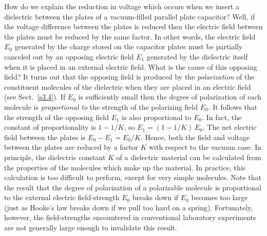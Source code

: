 How do we explain the reduction in voltage which occurs when we insert a
dielectric between the plates of a vacuum-filled parallel plate capacitor? 
Well, if the voltage difference between the plates is reduced then the
electric field between the plates must be reduced by the same factor. 
In other words, the electric field $E_0$ generated by the charge
stored on the capacitor plates  must be partially canceled out
by an opposing electric field $E_1$ generated  by the dielectric itself
when it is placed in an external electric field. What is the
cause of this opposing field? It turns out that the opposing field is
produced by the {\em polarization}\/ of the constituent molecules of the
dielectric when they are placed in an electric field (see Sect.~\ref{s3.4}). 
 If $E_0$ is sufficiently small then the degree of
polarization of each molecule is {\em proportional to}\/ the 
strength of the polarizing field
$E_0$. It follows that the strength of the  opposing field $E_1$ is also proportional
to $E_0$. In fact, the constant of proportionality is $1-1/K$, so
$E_1 = (1-1/K)\,E_0$. The net electric field between the plates is
$E_0 - E_1 = E_0/K$. Hence, both the field and
voltage between the plates are reduced by a factor
$K$ with respect to the vacuum case.
 In principle, the dielectric constant $K$ of a dielectric
material can be calculated from  the
properties of the molecules which make up the
material. In practice, this calculation is too difficult to perform, except
for very simple molecules. Note that the result that the degree of polarization of
a polarizable molecule is proportional to the external electric field-strength $E_0$ breaks down if $E_0$ becomes too large (just as Hooke's
law breaks down if we pull too hard on a spring). 
Fortunately, however, the field-strengths encountered in conventional
laboratory experiments are not generally large enough to invalidate this
result. 

